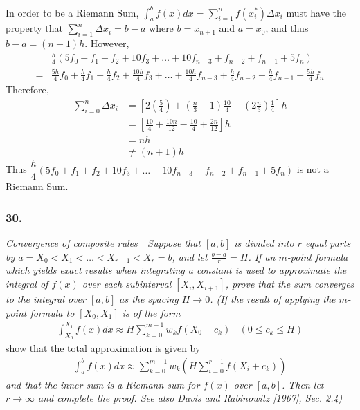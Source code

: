 \documentclass[12pt]{article}
\begin{document}
\begin{enumerate}[\it\ \ (a)\ \ ]
	In order to be a Riemann Sum, $\displaystyle\int_a^b f(x) dx = \displaystyle\sum\limits_{i=1}^n f(x_i^*)\Delta x_i$ must have the property that $\displaystyle\sum\limits_{i=1}^n\Delta x_i = b-a$ where $b = x_{n+1}$ and $a = x_0$, and thus $b-a = (n+1)h$.  However,
	\begin{align*}
		&\frac{h}{4}\left(5f_0 + f_1 + f_2 + 10f_3 + \dots + 10f_{n-3} + f_{n-2} + f_{n-1} + 5f_n\right) \\[.2cm]
		= &\frac{5h}{4}f_0 + \frac{h}{4}f_1 + \frac{h}{4}f_2 + \frac{10h}{4}f_3 + \dots + \frac{10h}{4}f_{n-3} + \frac{h}{4}f_{n-2} + \frac{h}{4}f_{n-1} + \frac{5h}{4}f_n
	\end{align*}
	Therefore,
	\begin{align*}
		\displaystyle\sum\limits_{i=0}^n\Delta x_i &= \left[2\left(\frac{5}{4}\right) + \left(\frac{n}{3} - 1\right)\frac{10}{4} + \left(2\frac{n}{3}\right)\frac{1}{4}\right]h \\
		&= \left[\frac{10}{4} + \frac{10n}{12} - \frac{10}{4} + \frac{2n}{12}\right]h \\
		&= nh \\
		&\neq (n+1)h
	\end{align*}
	Thus $\dfrac{h}{4}\left(5f_0 + f_1 + f_2 + 10f_3 + \dots + 10f_{n-3} + f_{n-2} + f_{n-1} + 5f_n\right)$ is not a Riemann Sum.

\end{enumerate}
















\subsubsection*{30.}
{\it {\rm Convergence of composite rules}\ \ Suppose that $[a, b]$ is divided into $r$ equal parts by $a = X_0 < X_1 < \dots < X_{r-1} < X_r = b$, and let $\frac{b - a}{r} = H$.  If an $m$-point formula which yields exact results when integrating a constant is used to approximate the integral of $f(x)$ over each subinterval $[X_i, X_{i+1}]$, prove that the sum converges to the integral over $[a, b]$ as the spacing $H \rightarrow 0$.  (If the result of applying the $m$-point formula to $[X_0, X_1]$ is of the form}
\begin{align*}
	\int_{X_0}^{X_1} f(x) dx \approx H \sum_{k = 0}^{m-1} w_k f(X_0 + c_k)\ \ \ \ (0 \leq c_k \leq H)
\end{align*}
show that the total approximation is given by
\begin{align*}
	\int_{a}^{b}f(x) dx \approx \sum\limits_{k = 0}^{m - 1} w_k \left(H\sum\limits_{i = 0}^{r - 1}f(X_i + c_k)\right)
\end{align*}
{\it and that the inner sum is a Riemann sum for $f(x)$ over $[a, b]$.  Then let $r \rightarrow \infty$ and complete the proof.  See also Davis and Rabinowitz [1967], Sec. 2.4)} \\
\end{document}
